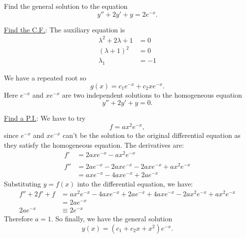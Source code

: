 \begin{example}
Find the general solution to the equation
\[y''+2y'+y=2e^{-x}.\]

\underline{Find the C.F.}: The auxiliary equation is
\begin{align*}
\lambda^2+2\lambda+1&=0\\
(\lambda+1)^2&=0\\
\lambda_1&=-1
\end{align*}

We have a repeated root so
\[g(x)=c_1e^{-x}+c_2xe^{-x}.\]
Here $e^{-x}$ and $xe^{-x}$ are two independent solutions to the homogeneous equation
\[y''+2y'+y=0.\]

\underline{Find a P.I.}: We have to try 
\[f=ax^2e^{-x},\]
since $e^{-x}$ and $xe^{-x}$ can't be the solution to the original differential equation as they satisfy the homogeneous equation.
The derivatives are:
\begin{align*}
f'&=2axe^{-x}-ax^2e^{-x}\\\\
f''&=2ae^{-x}-2axe^{-x}-2axe^{-x}+ax^2 e^{-x}\\&=axe^{-x}-4axe^{-x}+2ae^{-x}\end{align*}
Substituting $y=f(x)$ into the differential equation, we have:
\begin{align*}
f''+2f'+f &= ax^2e^{-x}-4axe^{-x}+2ae^{-x}+4axe^{-x}-2ax^2e^{-x}+ax^2e^{-x} \\
&=2ae^{-x} \\
2ae^{-x}&\equiv 2e^{-x}
\end{align*}
Therefore $a=1$. So finally, we have the general solution
\[y(x)=(c_1+c_2x+x^2)e^{-x}.\]
\end{example}
